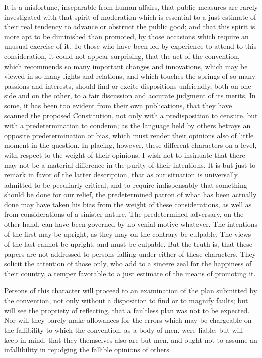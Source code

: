 It is a misfortune, inseparable from human affairs, that public measures are rarely investigated with that spirit of moderation which is essential to a just estimate of their real tendency to advance or obstruct the public good; and that this spirit is more apt to be diminished than promoted, by those occasions which require an unusual exercise of it. To those who have been led by experience to attend to this consideration, it could not appear surprising, that the act of the convention, which recommends so many important changes and innovations, which may be viewed in so many lights and relations, and which touches the springs of so many passions and interests, should find or excite dispositions unfriendly, both on one side and on the other, to a fair discussion and accurate judgment of its merits. In some, it has been too evident from their own publications, that they have scanned the proposed Constitution, not only with a predisposition to censure, but with a predetermination to condemn; as the language held by others betrays an opposite predetermination or bias, which must render their opinions also of little moment in the question. In placing, however, these different characters on a level, with respect to the weight of their opinions, I wish not to insinuate that there may not be a material difference in the purity of their intentions. It is but just to remark in favor of the latter description, that as our situation is universally admitted to be peculiarly critical, and to require indispensably that something should be done for our relief, the predetermined patron of what has been actually done may have taken his bias from the weight of these considerations, as well as from considerations of a sinister nature. The predetermined adversary, on the other hand, can have been governed by no venial motive whatever. The intentions of the first may be upright, as they may on the contrary be culpable. The views of the last cannot be upright, and must be culpable. But the truth is, that these papers are not addressed to persons falling under either of these characters. They solicit the attention of those only, who add to a sincere zeal for the happiness of their country, a temper favorable to a just estimate of the means of promoting it.

Persons of this character will proceed to an examination of the plan submitted by the convention, not only without a disposition to find or to magnify faults; but will see the propriety of reflecting, that a faultless plan was not to be expected. Nor will they barely make allowances for the errors which may be chargeable on the fallibility to which the convention, as a body of men, were liable; but will keep in mind, that they themselves also are but men, and ought not to assume an infallibility in rejudging the fallible opinions of others.

